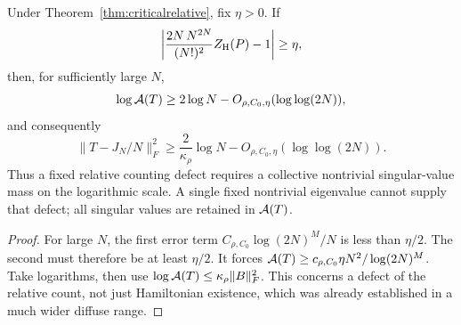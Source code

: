 \begin{corollary}
\label{cor:relativeinverse}
Under Theorem~\ref{thm:criticalrelative}, fix
\(\eta>0\). If
\[
 \left|\frac{2N\,N^{2N}}{(N!)^2}Z_{\rm H}(P)-1\right|\geq\eta,
\]
then, for sufficiently large \(N\),
\[
 \log{\cal A}(T)\geq
            2\log N-O_{\rho,C_0,\eta}(\log\log(2N)),
\]
and consequently
\[
 \|T-J_N/N\|_F^2\geq
    \frac2{\kappa_\rho}\log N
              -O_{\rho,C_0,\eta}(\log\log(2N)).
\]
Thus a fixed relative counting defect requires a collective
nontrivial singular-value mass on the logarithmic scale.
A single fixed nontrivial eigenvalue cannot supply that
defect; all singular values are retained in \({\cal A}(T)\).
\end{corollary}
\begin{proof}
For large \(N\), the first error term
\(C_{\rho,C_0}\log(2N)^M/N\) is less than \(\eta/2\).
The second must therefore be at least \(\eta/2\).
It forces
\({\cal A}(T)\geq c_{\rho,C_0}\eta N^2/\log(2N)^M\).
Take logarithms, then use
\(\log{\cal A}(T)\leq\kappa_\rho\|B\|_F^2\).
This concerns a defect of the relative count, not just
Hamiltonian existence, which was already established in a
much wider diffuse range.
\end{proof}
